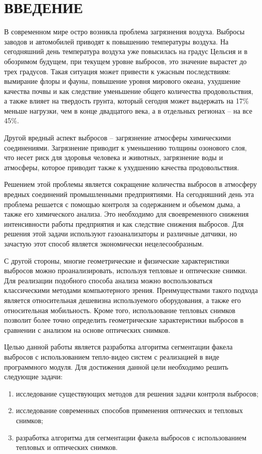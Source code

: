 \documentclass[14pt, a4paper]{extreport}
\begin{document}
	\firstpage
	\taskpage
	\newpage
	\annotationpage
	\renewcommand\contentsname{ОГЛАВЛЕНИЕ} 
	\tableofcontents
	\thispagestyle{empty}
	\chapter* {ВВЕДЕНИЕ} 
	В современном мире остро возникла проблема загрязнения воздуха. Выбросы заводов и автомобилей приводят к повышению температуры воздуха. На сегодняшний день температура воздуха уже повысилась на градус Цельсия и в обозримом будущем, при текущем уровне выбросов, это значение вырастет до трех градусов. Такая ситуация может привести к ужасным последствиям: вымирание флоры и фауны, повышение уровня мирового океана, ухудшение качества почвы и как следствие уменьшение общего количества продовольствия, а также влияет на твердость грунта, который сегодня может выдержать на 17\% меньше нагрузки, чем в конце двадцатого века, а в отдельных регионах -- на все 45\%. 
	
	Другой вредный аспект выбросов -- загрязнение атмосферы химическими соединениями. Загрязнение приводит к уменьшению толщины озонового слоя, что несет риск для здоровья человека и животных, загрязнение воды и атмосферы, которое приводит также к ухудшению качества продовольствия. 
	
	Решением этой проблемы является сокращение количества выбросов в атмосферу вредных соединений промышленными предприятиями. На сегодняшний день эта проблема решается с помощью контроля за содержанием и объемом дыма, а также его химического анализа. Это необходимо для своевременного снижения интенсивности работы предприятия и как следствие снижения выбросов. Для решения этой задачи используют газоанализаторы и различные датчики, но зачастую этот способ является экономически нецелесообразным. 
	
	С другой стороны, многие геометрические и физические характеристики выбросов можно проанализировать, используя тепловые и оптические снимки. Для реализации подобного способа анализа можно воспользоваться классическими методами компьютерного зрения. Преимуществами такого подхода является относительная дешевизна используемого оборудования, а также его относительная мобильность. Кроме того, использование тепловых снимков позволит более точно определить геометрические характеристики выбросов в сравнении с анализом на основе оптических снимков.
	
	Целью данной работы является разработка алгоритма сегментации факела выбросов с использованием тепло-видео систем с реализацией в виде программного модуля. Для достижения данной цели необходимо решить следующие задачи:
	\begin{enumerate}[label={\arabic*)}]
		\item исследование существующих методов для решения задачи контроля выбросов;
		\item исследование современных способов применения оптических и тепловых снимков;
		\item разработка алгоритма для сегментации факела выбросов с использованием тепловых и оптических снимков.
	\end{enumerate}
	
\end{document}
